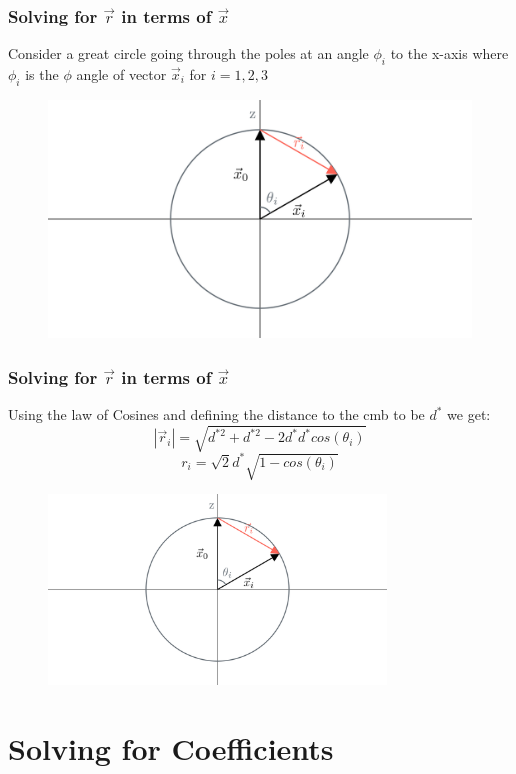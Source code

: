 \documentclass{beamer}
\begin{document}
    \begin{frame}
        \frametitle{Solving for $\vec r$ in terms of $\vec x$}
        Consider a great circle going through the poles at an angle $\phi_i$ to the x-axis where
        $\phi_i$ is the $\phi$ angle of vector $\vec x_i$ for $i = 1,2,3$\\
        \begin{figure}
            \centering
                \includegraphics[width=1\textwidth]{media/angle_conversion_diagram_2_ManimCE_v0.17.3.png}
            \end{figure}
    \end{frame}

    \begin{frame}
        \frametitle{Solving for $\vec r$ in terms of $\vec x$}
        Using the law of Cosines and defining the distance to the cmb to be $d^*$ we get:\\
        \begin{equation*}
            |\vec r_i| = \sqrt{d^{*2} + d^{*2} - 2d^*d^*cos(\theta_i)}
        \end{equation*}
        \begin{equation*}
            \boxed{r_i = \sqrt{2}d^*\sqrt{1 - cos(\theta_i)}}
        \end{equation*}

        \begin{figure}
            \centering
                \includegraphics[width=0.8\textwidth]{media/angle_conversion_diagram_2_ManimCE_v0.17.3.png}
            \end{figure}
    \end{frame}

\section{Solving for Coefficients}
\end{document}
